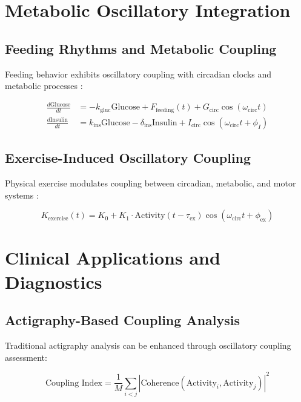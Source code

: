 \documentclass[twocolumn]{article}
\begin{document}
\section{Metabolic Oscillatory Integration}

\subsection{Feeding Rhythms and Metabolic Coupling}

Feeding behavior exhibits oscillatory coupling with circadian clocks and metabolic processes \citep{panda2016circadian}:

\begin{align}
\frac{d\text{Glucose}}{dt} &= -k_{\text{gluc}} \text{Glucose} + F_{\text{feeding}}(t) + G_{\text{circ}} \cos(\omega_{\text{circ}} t) \label{eq:glucose} \\
\frac{d\text{Insulin}}{dt} &= k_{\text{ins}} \text{Glucose} - \delta_{\text{ins}} \text{Insulin} + I_{\text{circ}} \cos(\omega_{\text{circ}} t + \phi_I) \label{eq:insulin}
\end{align}

\subsection{Exercise-Induced Oscillatory Coupling}

Physical exercise modulates coupling between circadian, metabolic, and motor systems \citep{schroeder2012voluntary}:

\begin{equation}
K_{\text{exercise}}(t) = K_0 + K_1 \cdot \text{Activity}(t-\tau_{\text{ex}}) \cos(\omega_{\text{circ}} t + \phi_{\text{ex}})
\label{eq:exercise_coupling}
\end{equation}

\section{Clinical Applications and Diagnostics}

\subsection{Actigraphy-Based Coupling Analysis}

Traditional actigraphy analysis can be enhanced through oscillatory coupling assessment:

\begin{equation}
\text{Coupling Index} = \frac{1}{M} \sum_{i<j} \left| \text{Coherence}(\text{Activity}_i, \text{Activity}_j) \right|^2
\label{eq:actigraphy_coupling}
\end{equation}
\end{document}
